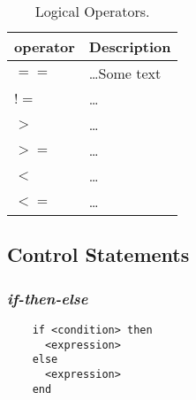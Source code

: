 \documentclass[11pt]{article}
\begin{document}
\begin{table}[ht]
  \centering
  \caption {Logical Operators.} \label{tab:title}
  \vspace{0.5em}
  \begin{tabular}{|m{8em}|b{25em}|}
  \hline

  \textbf{operator}
  &
  \vspace{0.7em}
  \textbf{Description} \\ [0.7em]
  \hline

  $==$
  &
  \vspace{0.7em}
  \dots Some text
  \\[0.7em]
  \hline

  $!=$
  &
  \vspace{0.7em}
  \dots
  \\[0.7em]
  \hline

  $>$
  &
  \vspace{0.7em}
  \dots
  \\[0.7em]
  \hline

  $>=$
  &
  \vspace{0.7em}
  \dots
  \\[0.7em]
  \hline

  $<$
  &
  \vspace{0.7em}
  \dots
  \\[0.7em]
  \hline

  $<=$
  &
  \vspace{0.7em}
  \dots
  \\[0.7em]
  \hline

  \end{tabular}
\end{table}

\subsection{Control Statements}
\subsubsection{\emph{if-then-else}}
\begin{listing}[H]
  \begin{verbatim}
    if <condition> then
      <expression>
    else
      <expression>
    end
  \end{verbatim}
  \label{lst:the-code}
\end{listing}
\end{document}
